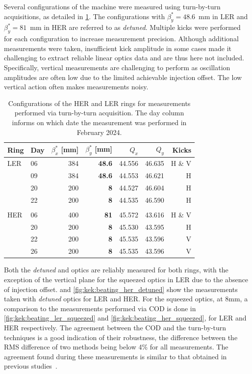 Several configurations of the machine were measured using turn-by-turn acquisitions, as detailed in
\cref{tab:superkekb:configurations}. The configurations with $\beta_y^* = 48.6$~mm in LER and
$\beta_y^* = 81$~mm in HER are referred to as \textit{detuned}. Multiple kicks were performed for
each configuration to increase measurement precision. Although additional measurements were taken,
insufficient kick amplitude in some cases made it challenging to extract reliable linear optics data
and are thus here not included. Specifically, vertical measurements are challenging to perform as
oscillation amplitudes are often low due to the limited achievable injection offset. The low 
vertical action often makes measurements noisy.

\begin{table}
    \centering
    \begin{tabular}{llrrrrr}
    \hline
    Ring & Day & $\beta_x^*$ [mm] & $\beta_y^*$ [mm] & $Q_x$ & $Q_y$ & Kicks\\
    \hline
    LER        & 06 & 384 &\textbf{48.6} & 44.556 & 46.635 & H \& V \\
               & 09 & 384 &\textbf{48.6} & 44.553 & 46.621 & H  \\
               \hdashline
               & 20 & 200 & \textbf{8}   & 44.527 & 46.604 & H \\
               & 22 & 200 & \textbf{8}   & 44.535 & 46.590 & H \\
               &&&&&& \\
    HER        & 06 & 400 & \textbf{81}  & 45.572 & 43.616 & H \& V\\
               \hdashline
               & 20 & 200 & \textbf{8} & 45.530 & 43.595 & H \\
               & 22 & 200 & \textbf{8} & 45.535 & 43.596 & V \\
               & 26 & 200 & \textbf{8} & 45.535 & 43.596 & V \\
    \bottomrule
    \end{tabular}
  \caption{Configurations of the HER and LER rings for measurements performed via turn-by-turn
  acquisition. The day column informs on which date the measurement was performed in February 2024.}
  \label{tab:superkekb:configurations}
\end{table}

Both the \textit{detuned} and  optics are reliably measured for both rings, with
the exception of the vertical plane for the squeezed optics in LER due to the absence of injection
offset.
 and \cref{fig:kek:beating_her_detuned} show the measurements
taken with \textit{detuned} optics for LER and HER. For the squeezed optics, at 8mm, a comparison to
the measurements performed via COD is done in \cref{fig:kek:beating_ler_squeezed} and
\cref{fig:kek:beating_her_squeezed}, for LER and HER respectively. The agreement between the COD
and the turn-by-turn techniques is a good indication of their robustness, the difference between the
RMS difference of two methods being below 4\% for all measurements. The agreement found during these
measurements is similar to that obtained in previous studies~\cite{keintzel_jacqueline_beam_2022}.


